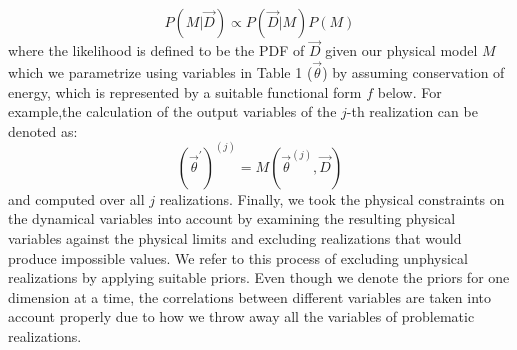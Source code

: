 \begin{equation}
    P(M|\vec{D}) \propto P(\vec{D}|M)P(M)
\end{equation}
where the likelihood is defined to be the PDF of $\vec{D}$ given our
physical model $M$ which we parametrize using variables in Table 1
($\vec{\theta}$) by
assuming conservation of energy, which is
represented by a suitable functional form $f$ below. For example,the
calculation of the output variables of the $j$-th realization can be denoted as: 
\begin{equation}
    (\vec{\theta}^\prime)^{(j)} = M(\vec{\theta}^{(j)}, \vec{D}) 
\end{equation}    
and computed over all $j$ realizations. Finally, we took the physical
constraints on the dynamical variables into account by
examining the resulting physical variables against the physical limits and
excluding realizations that would produce impossible values. We refer to this
process of excluding unphysical realizations by applying suitable priors. 
Even though we denote the priors for one dimension at a time, 
the correlations between different variables are taken into account
properly due to how we throw away all the variables of problematic
realizations. 
